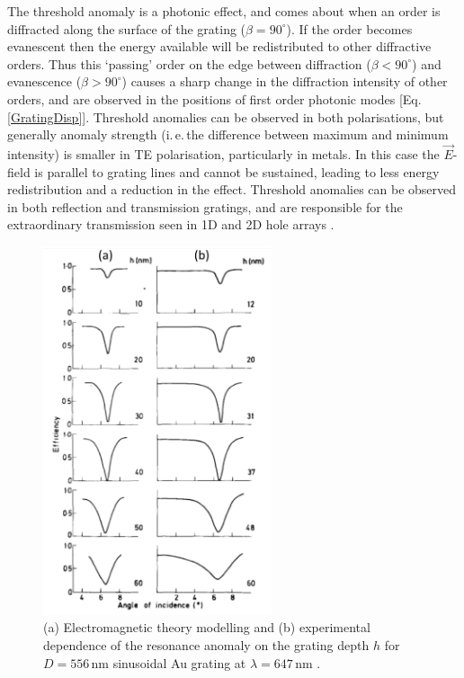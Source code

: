 The threshold anomaly is a photonic effect, and comes about when an order is diffracted along the surface of the grating ($\beta=90^{\circ}$). If the order becomes evanescent then the energy available will be redistributed to other diffractive orders. Thus this `passing' order on the edge between diffraction ($\beta<90^{\circ}$) and evanescence ($\beta>90^{\circ}$) causes a sharp change in the diffraction intensity of other orders, and are observed in the positions of first order photonic modes [Eq.\,\ref{GratingDisp}]. Threshold anomalies can be observed in both polarisations, but generally anomaly strength (i.\,e.\,the difference between maximum and minimum intensity) is smaller in TE polarisation, particularly in metals. In this case the $\vec{E}$-field is parallel to grating lines and cannot be sustained, leading to less energy redistribution and a reduction in the effect. Threshold anomalies can be observed in both reflection and transmission gratings, and are responsible for the extraordinary transmission seen in 1D and 2D hole arrays \cite{Fano1941, Hessel1965, Lee2005, Lochbihler1994, Ritchie1968, Treacy2002, Watts1997}.
\begin{figure}[h!] 
\centering    
\includegraphics[width=0.6\textwidth]{Fig5}
\caption{(a) Electromagnetic theory modelling and (b) experimental dependence of the resonance anomaly on the grating depth $h$ for $D=556$\,nm sinusoidal Au grating at $\lambda=647$\,nm \cite{Hutley1976}. }
\label{3Fig5}
\end{figure}

